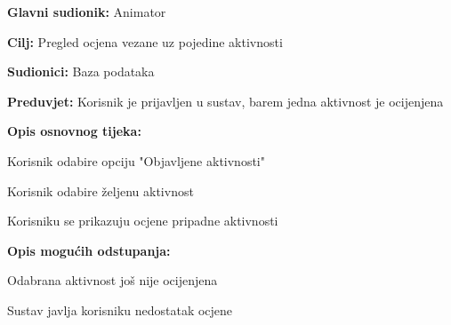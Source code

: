 					\noindent {}
					\begin{packed_item}
						
						\item \textbf{Glavni sudionik: } Animator
						\item  \textbf{Cilj:} Pregled ocjena vezane uz pojedine aktivnosti
						\item  \textbf{Sudionici:} Baza podataka
						\item  \textbf{Preduvjet:} Korisnik je prijavljen u sustav, barem jedna aktivnost je ocijenjena
						\item  \textbf{Opis osnovnog tijeka:}
						
						\item[] \begin{packed_enum}
							
							\item Korisnik odabire opciju "Objavljene aktivnosti"
							\item Korisnik odabire željenu aktivnost
							\item Korisniku se prikazuju ocjene pripadne aktivnosti

						\end{packed_enum}
						
						\item  \textbf{Opis mogućih odstupanja:}
						
						\item[] \begin{packed_item}
							
							\item[2.a] Odabrana aktivnost još nije ocijenjena
							\item[] \begin{packed_enum}
								
								\item Sustav javlja korisniku nedostatak ocjene
								
							\end{packed_enum}
							
						\end{packed_item}
					\end{packed_item}										
				

